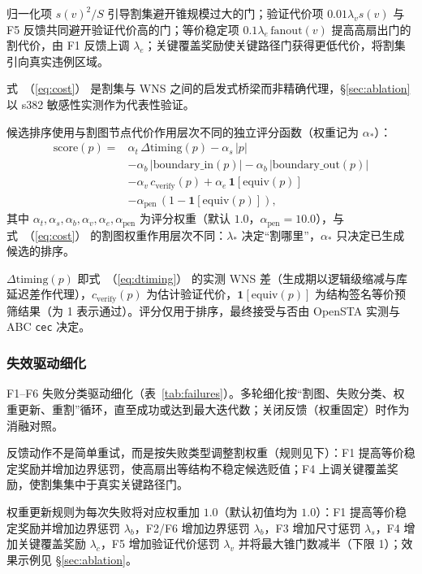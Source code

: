 \documentclass[journal]{IEEEtran}
\renewcommand{\eqref}[1]{\textup{（\ref{#1}）}}
\begin{document}
归一化项 $s(v)^2/S$ 引导割集避开锥规模过大的门；验证代价项 $0.01\lambda_v s(v)$ 与 F5 反馈共同避开验证代价高的门；等价稳定项 $0.1\lambda_e\,\mathrm{fanout}(v)$ 提高高扇出门的割代价，由 F1 反馈上调 $\lambda_e$；关键覆盖奖励使关键路径门获得更低代价，将割集引向真实违例区域。

式~\eqref{eq:cost} 是割集与 WNS 之间的启发式桥梁而非精确代理，\S\ref{sec:ablation} 以 s382 敏感性实测作为代表性验证。

候选排序使用与割图节点代价作用层次不同的独立评分函数（权重记为 $\alpha_*$）：
{\small
\begin{equation}\label{eq:score}
\begin{split}
\mathrm{score}(p) = {}&\alpha_t\,\Delta\mathrm{timing}(p) - \alpha_s\,|p| \\
&- \alpha_b\,|\mathrm{boundary\_in}(p)| - \alpha_b\,|\mathrm{boundary\_out}(p)| \\
&- \alpha_v\,c_{\mathrm{verify}}(p) + \alpha_e\,\mathbf{1}[\mathrm{equiv}(p)] \\
&- \alpha_{\mathrm{pen}}\,(1-\mathbf{1}[\mathrm{equiv}(p)]),
\end{split}
\end{equation}
}
其中 $\alpha_t,\alpha_s,\alpha_b,\alpha_v,\alpha_e,\alpha_{\mathrm{pen}}$ 为评分权重（默认 $1.0$，$\alpha_{\mathrm{pen}}=10.0$），与式~\eqref{eq:cost} 的割图权重作用层次不同：$\lambda_*$ 决定“割哪里”，$\alpha_*$ 只决定已生成候选的排序。

$\Delta\mathrm{timing}(p)$ 即式~\eqref{eq:dtiming} 的实测 WNS 差（生成期以逻辑级缩减与库延迟差作代理），$c_{\mathrm{verify}}(p)$ 为估计验证代价，$\mathbf{1}[\mathrm{equiv}(p)]$ 为结构签名等价预筛结果（为 1 表示通过）。评分仅用于排序，最终接受与否由 OpenSTA 实测与 ABC \texttt{cec} 决定。

\subsubsection{失效驱动细化}
F1--F6 失败分类驱动细化（表~\ref{tab:failures}）。多轮细化按“割图、失败分类、权重更新、重割”循环，直至成功或达到最大迭代数；关闭反馈（权重固定）时作为消融对照。

反馈动作不是简单重试，而是按失败类型调整割权重（规则见下）：F1 提高等价稳定奖励并增加边界惩罚，使高扇出等结构不稳定候选贬值；F4 上调关键覆盖奖励，使割集集中于真实关键路径门。

权重更新规则为每次失败将对应权重加 $1.0$（默认初值均为 $1.0$）：F1 提高等价稳定奖励并增加边界惩罚 $\lambda_b$，F2/F6 增加边界惩罚 $\lambda_b$，F3 增加尺寸惩罚 $\lambda_s$，F4 增加关键覆盖奖励 $\lambda_c$，F5 增加验证代价惩罚 $\lambda_v$ 并将最大锥门数减半（下限 1）；效果示例见 \S\ref{sec:ablation}。
\end{document}

